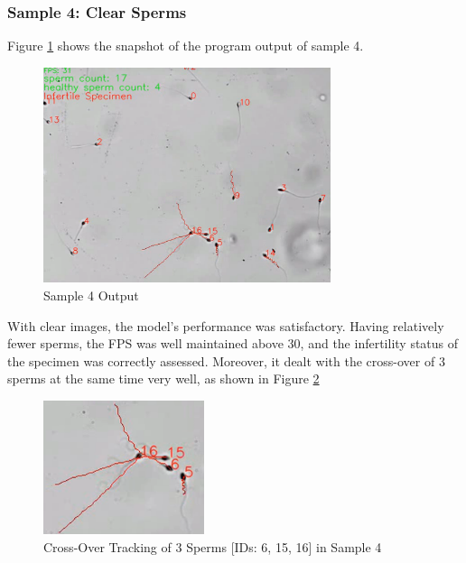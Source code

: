 \subsubsection{Sample 4: Clear Sperms}
Figure \ref{sam4res} shows the snapshot of the program output of sample 4.
\begin{figure}[h]
    \centering
    \includegraphics[width=0.75\textwidth]{Images/sam4.png}
    \caption{Sample 4 Output}
    \label{sam4res}
\end{figure}

With clear images, the model's performance was satisfactory. Having relatively fewer sperms, the FPS was well maintained above 30, and the infertility status of the specimen was correctly assessed. Moreover, it dealt with the cross-over of 3 sperms at the same time very well, as shown in Figure \ref{sam4cross}
\begin{figure}[h]
    \centering
    \includegraphics[width=0.42\textwidth]{Images/sam44.png}
    \caption{Cross-Over Tracking of 3 Sperms [IDs: 6, 15, 16] in Sample 4}
    \label{sam4cross}
\end{figure}

\newpage
